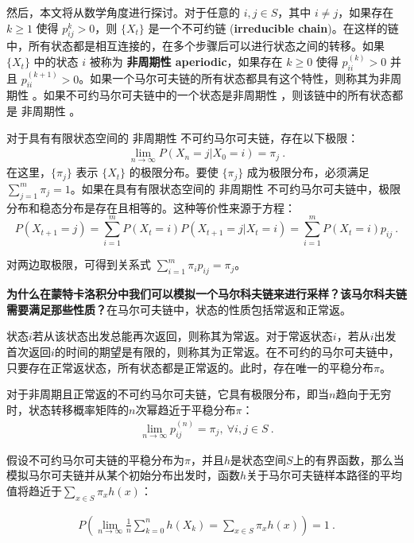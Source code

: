 然后，本文将从数学角度进行探讨。对于任意的 $i,j\in S$，其中 $i \neq j$，如果存在 $k\geq 1$ 使得 $p_{ij}^k > 0$，则 $\{X_t\}$ 是一个不可约链 (\textbf{irreducible chain})。在这样的链中，所有状态都是相互连接的，在多个步骤后可以进行状态之间的转移。如果 $\{X_t\}$ 中的状态 $i$ 被称为 \textbf{非周期性  aperiodic}，如果存在 $k\geq 0$ 使得 $p_{ii}^{(k)} > 0$ 并且 $p_{ii}^{(k+1) } > 0$。如果一个马尔可夫链的所有状态都具有这个特性，则称其为非周期性 。如果不可约马尔可夫链中的一个状态是非周期性  ，则该链中的所有状态都是 非周期性 。

对于具有有限状态空间的 非周期性 不可约马尔可夫链，存在以下极限：
\begin{align}
   \lim_{n\to\infty} P(X_n = j | X_0=i) = \pi_j~.
\end{align}
在这里，$\{\pi_j\}$ 表示 $\{X_t\}$ 的极限分布。要使 $\{\pi_j\}$ 成为极限分布，必须满足 $\sum_{j=1}^m \pi_j=1$。如果在具有有限状态空间的 非周期性  不可约马尔可夫链中，极限分布和稳态分布是存在且相等的。这种等价性来源于方程：
\begin{equation} 
P(X_{t+1}=j)=\sum_{i=1}^{m}P(X_{t}=i)P(X_{t+1}=j|X_ {t}=i)=\sum_{i=1}^{m}P(X_{t}=i)p_{i j}~.
\end{equation}

对两边取极限，可得到关系式 $\sum_{i=1}^m \pi_i p_{ij} = \pi_j$。 

\textbf{为什么在蒙特卡洛积分中我们可以模拟一个马尔科夫链来进行采样？该马尔科夫链需要满足那些性质？}在马尔可夫链中，状态的性质包括常返和正常返。

状态$i$若从该状态出发总能再次返回，则称其为常返。对于常返状态$i$，若从$i$出发首次返回$i$的时间的期望是有限的，则称其为正常返。在不可约的马尔可夫链中，只要存在正常返状态，所有状态都是正常返的。此时，存在唯一的平稳分布$\pi$。

对于非周期且正常返的不可约马尔可夫链，它具有极限分布，即当$n$趋向于无穷时，状态转移概率矩阵的$n$次幂趋近于平稳分布$\pi$：
\begin{align}
    \lim_{n\to\infty} p_{ij}^{(n)} = \pi_j, \ \forall i, j \in S ~.
\end{align}

假设不可约马尔可夫链的平稳分布为$\pi$，并且$h$是状态空间$S$上的有界函数，那么当模拟马尔可夫链并从某个初始分布出发时，函数$h$关于马尔可夫链样本路径的平均值将趋近于$\sum_{x \in S} \pi_x h(x)$：

\begin{align}
P\left( \lim_{n\to\infty} \frac{1}{n} \sum_{k=0}^n h(X_k) = \sum_{x \in S} \pi_x h(x) \right) = 1~.
\end{align}

